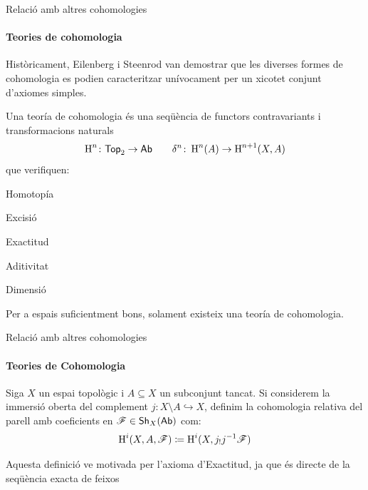 \documentclass[notheorems, aspectratio=169]{beamer}
\begin{document}
\begin{frame}{Relació amb altres cohomologies}
  \framesubtitle{Teories de cohomologia}
  Històricament, Eilenberg i Steenrod van demostrar que les diverses formes de cohomologia es podien caracteritzar unívocament per un xicotet conjunt d'axiomes simples.
  \pause
  \begin{definition}
    Una \alert<2>{teoría de cohomologia} és una seqüència de functors contravariants i transformacions naturals
    \begin{equation*}
      \operatorname{H}^{n}\colon \mathsf{Top}_{2} \to \mathsf{Ab} \qquad \delta^{n}\colon \operatorname{H}^{n}(A) \to \operatorname{H}^{n+1}(X, A)
    \end{equation*}
    que verifiquen:
    \begin{itemize*}
      \item Homotopía
      \item Excisió
      \item Exactitud
      \item Aditivitat
      \item Dimensió
    \end{itemize*}
  \end{definition}
  \pause

  Per a espais suficientment bons, solament existeix \alert<3>{una} teoría de cohomologia.
\end{frame}

\begin{frame}[fragile]{Relació amb altres cohomologies}
  \framesubtitle{Teories de Cohomologia}
  \begin{definition}
    Siga \(X\) un espai topològic i \(A \subseteq X\) un subconjunt tancat.
    Si considerem la immersió oberta del complement \(j\colon X \setminus A \hookrightarrow X\), definim la \alert<1>{cohomologia relativa} del parell amb coeficients en \(\mathscr{F} \in \mathsf{Sh}_{X}(\mathsf{Ab})\) com:
    \begin{equation*}
      \operatorname{H}^{i}(X, A, \mathscr{F}) \coloneq \operatorname{H}^{i}(X, j_{!}j^{-1}\mathscr{F})
    \end{equation*}
  \end{definition}
  \pause
  
  Aquesta definició ve motivada per l'axioma d'Exactitud, ja que és directe de la seqüència exacta de feixos
  \begin{center}
  \end{center}
\end{frame}
\end{document}
